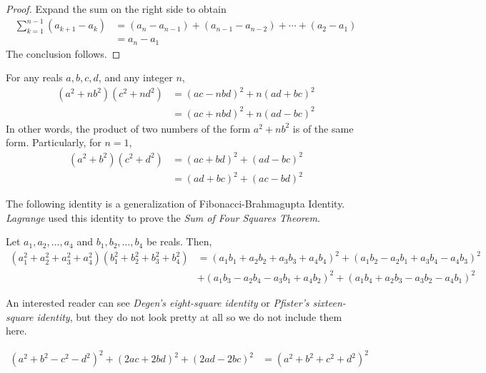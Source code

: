 \documentclass[main.tex]{subfile}
\begin{document}
\begin{appendix}
	\begin{proof}
		Expand the sum on the right side to obtain
			\begin{align*}
				\sum_{k=1}^{n-1} \left(a_{k+1} - a_{k}\right)
					&=  \left(a_{n} - a_{n-1}\right) +  \left(a_{n-1} - a_{n-2}\right) + \cdots +  \left(a_{2} - a_{1}\right)\\
					&= a_n - a_1
			\end{align*}
		The conclusion follows.
	\end{proof}


	\begin{identity}\label{id:fibbr}
		For any reals $a,b,c,d$, and any integer $n$,
		\begin{align*}
			(a^2+nb^2)(c^2+nd^2)&=(ac-nbd)^2+n(ad+bc)^2\\
			&=(ac+nbd)^2+n(ad-bc)^2
		\end{align*}
		In other words, the product of two numbers of the form $a^2+nb^2$ is of the same form. Particularly, for $n=1$,
		\begin{align*}
			(a^2+b^2)(c^2+d^2)&=(ac+bd)^2+(ad-bc)^2\\
			&=(ad+bc)^2+(ac-bd)^2
		\end{align*}
	\end{identity}

	The following identity is a generalization of Fibonacci-Brahmagupta Identity. \textit{Lagrange} used this identity to prove the \textit{Sum of Four Squares Theorem}.

	\begin{identity}\label{id:foursqr}
		Let $a_1,a_2,\ldots,a_4$ and $b_1,b_2,\ldots,b_4$ be reals. Then,
		\begin{align*}
			(a_1^2+a_2^2+a_3^2+a_4^2)(b_1^2+b_2^2+b_3^2+b_4^2)
				& =(a_1 b_1 + a_2 b_2 + a_3 b_3 + a_4 b_4)^2 +(a_1 b_2 - a_2 b_1 + a_3 b_4 - a_4 b_3)^2\\
				& +(a_1 b_3 - a_2 b_4 - a_3 b_1 + a_4 b_2)^2 +(a_1 b_4 + a_2 b_3 - a_3 b_2 - a_4 b_1)^2
		\end{align*}
	\end{identity}
	An interested reader can see \textit{Degen's eight-square identity} or \textit{Pfister's sixteen-square identity}, but they do not look pretty at all so we do not include them here.

	\begin{identity}\label{id:lebesgue}
		\begin{align*}
			(a^2+b^2-c^2-d^2)^2 + (2ac+2bd)^2 + (2ad-2bc)^2 & = (a^2+b^2+c^2+d^2)^2
		\end{align*}
	\end{identity}


\end{appendix}
\end{document}
